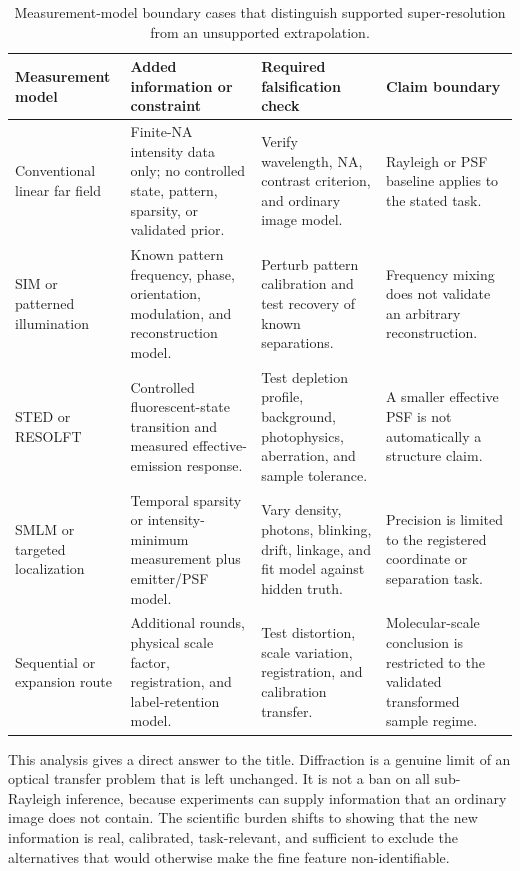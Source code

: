 \documentclass[conference]{IEEEtran}
\begin{document}
\begin{table}[t]
\caption{Measurement-model boundary cases that distinguish supported super-resolution from an unsupported extrapolation.}
\label{tab:boundaries}
\centering
\footnotesize
\setlength{\tabcolsep}{3pt}
\begin{tabular}{p{} p{} p{} p{}}
\hline
\textbf{Measurement model} & \textbf{Added information or constraint} & \textbf{Required falsification check} & \textbf{Claim boundary}\\
\hline
Conventional linear far field & Finite-NA intensity data only; no controlled state, pattern, sparsity, or validated prior. & Verify wavelength, NA, contrast criterion, and ordinary image model. & Rayleigh or PSF baseline applies to the stated task.\\
SIM or patterned illumination & Known pattern frequency, phase, orientation, modulation, and reconstruction model. & Perturb pattern calibration and test recovery of known separations. & Frequency mixing does not validate an arbitrary reconstruction.\\
STED or RESOLFT & Controlled fluorescent-state transition and measured effective-emission response. & Test depletion profile, background, photophysics, aberration, and sample tolerance. & A smaller effective PSF is not automatically a structure claim.\\
SMLM or targeted localization & Temporal sparsity or intensity-minimum measurement plus emitter/PSF model. & Vary density, photons, blinking, drift, linkage, and fit model against hidden truth. & Precision is limited to the registered coordinate or separation task.\\
Sequential or expansion route & Additional rounds, physical scale factor, registration, and label-retention model. & Test distortion, scale variation, registration, and calibration transfer. & Molecular-scale conclusion is restricted to the validated transformed sample regime.\\
\hline
\end{tabular}
\end{table}

This analysis gives a direct answer to the title. Diffraction is a genuine limit of an optical transfer problem that is left unchanged. It is not a ban on all sub-Rayleigh inference, because experiments can supply information that an ordinary image does not contain. The scientific burden shifts to showing that the new information is real, calibrated, task-relevant, and sufficient to exclude the alternatives that would otherwise make the fine feature non-identifiable.
\end{document}
